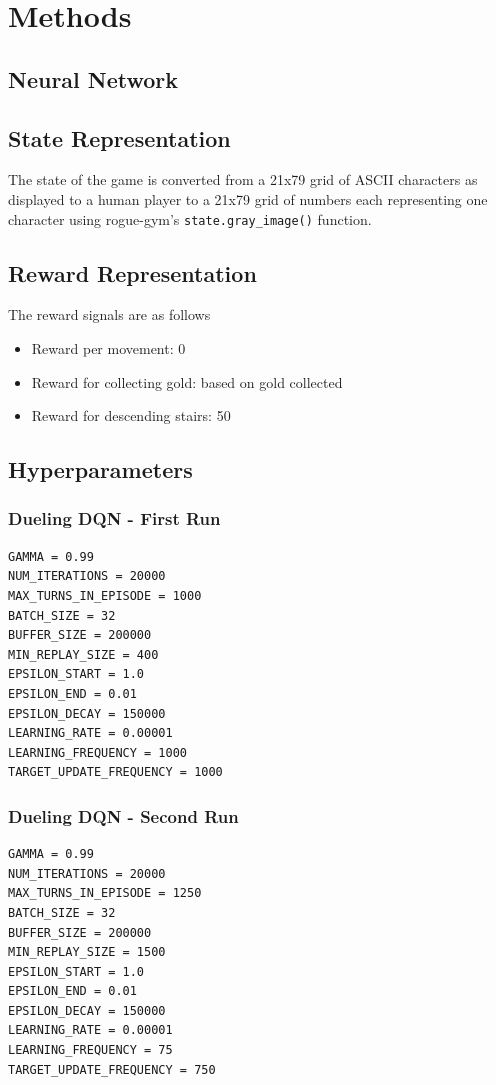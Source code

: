 \documentclass[12pt,a4paper]{article}
\begin{document}
    \section{Methods}\label{sec:methods}

    \subsection{Neural Network}\label{subsec:neural-network2}
    \subsection{State Representation}\label{subsec:state-representation}
    The state of the game is converted from a 21x79 grid of ASCII characters as displayed to a human player to a 21x79 grid of
    numbers each representing one character using rogue-gym's \texttt{state.gray\_image()} function.

    \subsection{Reward Representation}\label{subsec:reward-representation}
    The reward signals are as follows
    \begin{itemize}
        \item Reward per movement: 0
        \item Reward for collecting gold: based on gold collected
        \item Reward for descending stairs: 50
    \end{itemize}

    \subsection{Hyperparameters}\label{subsec:hyperparameters}
    \subsubsection{Dueling DQN - First Run}
    \begin{lstlisting}[label={lst:ddqn1hyperparameters}]
GAMMA = 0.99
NUM_ITERATIONS = 20000
MAX_TURNS_IN_EPISODE = 1000
BATCH_SIZE = 32
BUFFER_SIZE = 200000
MIN_REPLAY_SIZE = 400
EPSILON_START = 1.0
EPSILON_END = 0.01
EPSILON_DECAY = 150000
LEARNING_RATE = 0.00001
LEARNING_FREQUENCY = 1000
TARGET_UPDATE_FREQUENCY = 1000
    \end{lstlisting}

    \subsubsection{Dueling DQN - Second Run}
    \begin{lstlisting}[label={lst:ddqn2hyperparameters}]
GAMMA = 0.99
NUM_ITERATIONS = 20000
MAX_TURNS_IN_EPISODE = 1250
BATCH_SIZE = 32
BUFFER_SIZE = 200000
MIN_REPLAY_SIZE = 1500
EPSILON_START = 1.0
EPSILON_END = 0.01
EPSILON_DECAY = 150000
LEARNING_RATE = 0.00001
LEARNING_FREQUENCY = 75
TARGET_UPDATE_FREQUENCY = 750
    \end{lstlisting}
\end{document}
